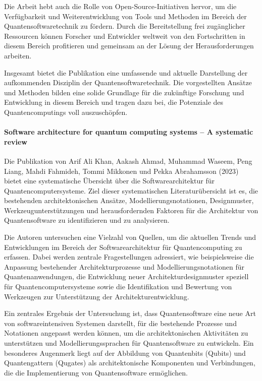 Die Arbeit hebt auch die Rolle von Open-Source-Initiativen hervor, um die Verfügbarkeit und Weiterentwicklung von Tools 
und Methoden im Bereich der Quantensoftwaretechnik zu fördern. Durch die Bereitstellung frei zugänglicher Ressourcen 
können Forscher und Entwickler weltweit von den Fortschritten in diesem Bereich profitieren und gemeinsam an der Lösung 
der Herausforderungen arbeiten.

Insgesamt bietet die Publikation eine umfassende und aktuelle Darstellung der aufkommenden Disziplin der Quantensoftwaretechnik. 
Die vorgestellten Ansätze und Methoden bilden eine solide Grundlage für die zukünftige Forschung und Entwicklung in diesem 
Bereich und tragen dazu bei, die Potenziale des Quantencomputings voll auszuschöpfen.

\paragraph{Software architecture for quantum computing systems – A systematic review}

Die Publikation von Arif Ali Khan, Aakash Ahmad, Muhammad Waseem, Peng Liang, Mahdi Fahmideh, Tommi Mikkonen und Pekka 
Abrahamsson (2023)~\cite{khan2023software} bietet eine systematische Übersicht über die Softwarearchitektur für Quantencomputersysteme. Ziel 
dieser systematischen Literaturübersicht ist es, die bestehenden architektonischen Ansätze, Modellierungsnotationen, 
Designmuster, Werkzeugunterstützungen und herausfordernden Faktoren für die Architektur von Quantensoftware zu 
identifizieren und zu analysieren.

Die Autoren untersuchen eine Vielzahl von Quellen, um die aktuellen Trends und Entwicklungen im Bereich der Softwarearchitektur 
für Quantencomputing zu erfassen. Dabei werden zentrale Fragestellungen adressiert, wie beispielsweise die Anpassung bestehender 
Architekturprozesse und Modellierungsnotationen für Quantenanwendungen, die Entwicklung neuer Architekturdesignmuster speziell 
für Quantencomputersysteme sowie die Identifikation und Bewertung von Werkzeugen zur Unterstützung der Architekturentwicklung.

Ein zentrales Ergebnis der Untersuchung ist, dass Quantensoftware eine neue Art von softwareintensiven Systemen darstellt, für 
die bestehende Prozesse und Notationen angepasst werden können, um die architektonischen Aktivitäten zu unterstützen und 
Modellierungssprachen für Quantensoftware zu entwickeln. Ein besonderes Augenmerk liegt auf der Abbildung von 
Quantenbits (Qubits) und Quantengattern (Qugates) als architektonische Komponenten und Verbindungen, die die 
Implementierung von Quantensoftware ermöglichen.

